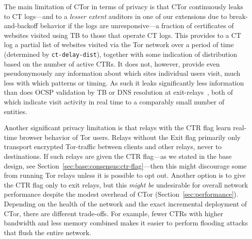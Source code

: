 The main limitation of CTor in terms of privacy is that CTor continuously leaks
to CT logs---and to a \emph{lesser extent} auditors in one of our extensions due
to break-and-backoff behavior if the logs are unresponsive---a fraction of
certificates of websites visited using TB to those that operate CT logs.
This provides
to a CT log a partial list of websites visited via the Tor network over a period
of time (determined by \texttt{ct-delay-dist}), together with some indication of
distribution based on the number of active CTRs. It does not, however, provide
even pseudonymously any information about which sites individual users visit,
much less with which patterns or timing. As such it leaks significantly less
information than does OCSP validation by TB or DNS resolution at
exit-relays~\cite{TorDNS}, both of which indicate visit activity in real time to
a comparably small number of entities.

Another significant privacy limitation is that relays with the CTR flag learn
real-time browser behavior of Tor users. Relays without the Exit flag primarily
only transport encrypted Tor-traffic between clients and other relays, never to
destinations. If such relays are given the CTR flag---as we stated in the base
design, see Section~\ref{sec:base:consensus:ctr-flag}---then this might
discourage some from running Tor relays unless it is possible to opt out.
Another option is to give the CTR flag only to exit relays, but this \emph{might
be} undesirable for overall network performance despite the modest overhead of
CTor (Section~\ref{sec:performance}). Depending on the health of the network
and the exact incremental deployment of CTor, there are different trade-offs.
For example, fewer CTRs with higher bandwidth and less memory combined makes it
easier to perform flooding attacks that flush the entire network.
